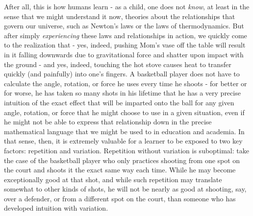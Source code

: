 \documentclass[12pt]{article}
\begin{document}
After all, this is how humans learn - as a child, one does not \textit{know}, at least in the sense that we might understand it now, theories about the relationships that govern our universe, such as Newton's laws or the laws of thermodynamics. But after simply \textit{experiencing} these laws and relationships in action, we quickly come to the realization that - yes, indeed, pushing Mom's vase off the table will result in it falling downwards due to gravitational force and shatter upon impact with the ground - and yes, indeed, touching the hot stove causes heat to transfer quickly (and painfully) into one's fingers. A basketball player does not have to calculate the angle, rotation, or force he uses every time he shoots - for better or for worse, he has taken so many shots in his lifetime that he has a very precise intuition of the exact effect that will be imparted onto the ball for any given angle, rotation, or force that he might choose to use in a given situation, even if he might not be able to express that relationship down in the precise mathematical language that we might be used to in education and academia. In that sense, then, it is extremely valuable for a learner to be exposed to two key factors: repetition and variation. Repetition without variation is suboptimal: take the case of the basketball player who only practices shooting from one spot on the court and shoots it the exact same way each time. While he may become exceptionally good at that shot, and while such repetition may translate somewhat to other kinds of shots, he will not be nearly as good at shooting, say, over a defender, or from a different spot on the court, than someone who has developed intuition with variation.\\
\end{document}

